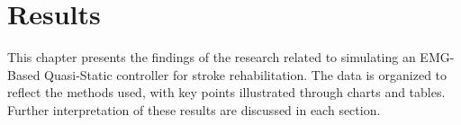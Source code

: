 \chapter{Results}
This chapter presents the findings of the research related to simulating an EMG-Based Quasi-Static controller for stroke rehabilitation. The data is organized to reflect the methods used, with key points illustrated through charts and tables. Further interpretation of these results are discussed in each section.


\newpage

\newpage



